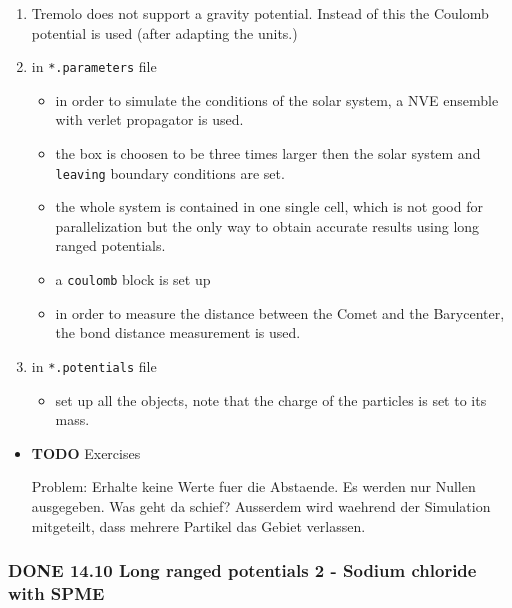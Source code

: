 \documentclass[11pt]{article}
\begin{document}
\begin{enumerate}
\item Tremolo does not support a gravity potential. Instead of this the Coulomb potential is used (after adapting the units.)
\item in \texttt{*.parameters} file

\begin{itemize}
\item in order to simulate the conditions of the solar system, a NVE ensemble with verlet propagator is used.
\item the box is choosen to be three times larger then the solar system and \texttt{leaving} boundary conditions are set.
\item the whole system is contained in one single cell, which is not good for parallelization but the only way to obtain accurate results using long ranged potentials.
\item a \texttt{coulomb} block is set up
\item in order to measure the distance between the Comet and the Barycenter, the bond distance measurement is used.
\end{itemize}

\item in \texttt{*.potentials} file

\begin{itemize}
\item set up all the objects, note that the charge of the particles is set to its mass.
\end{itemize}

\end{enumerate}
\begin{itemize}

\item \textbf{TODO} Exercises\\
\label{sec-2.4.9.1}

Problem: Erhalte keine Werte fuer die Abstaende. Es werden nur Nullen ausgegeben. Was geht da schief? Ausserdem wird waehrend der Simulation mitgeteilt, dass mehrere Partikel das Gebiet verlassen. 




\end{itemize} %
\subsubsection{\textbf{DONE} 14.10 Long ranged potentials 2 - Sodium chloride with SPME}
\label{sec-2.4.10}
\end{document}
